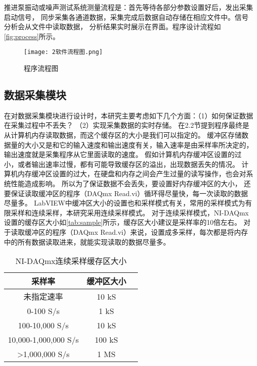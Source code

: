 推进泵振动或噪声测试系统测量流程是：首先等待各部分参数设置好后，发出采集启动信号，
同步采集各通道数据，采集完成后数据自动存储在相应文件中。信号分析会从文件中读取数据，
分析结果实时展示在界面。程序设计流程如\autoref{fig:process}所示。
\begin{figure}[htbp]
    \centering
    \texttt{[image: 2软件流程图.png]}
    \caption{\label{fig:process}程序流程图}
\end{figure}

\begin{comment}
\subsection{系统设置模块}
软件界面的设置模块提供了测试系统各项参数设定，包括采集通道设置、采样参数设置、
传感器灵敏度设置、分析参数设置等。
\begin{figure}[htbp]
    \centering
    \texttt{[image: 2系统设置.png]}
    \caption{\label{fig:setting}系统设置}
\end{figure}
\end{comment}

\subsection{数据采集模块}
在对数据采集模块进行设计时，本研究主要考虑如下几个方面：（1）如何保证数据在采集过程中不丢失？
（2）实现采集数据的实时存储。
在2.2节提到程序最终是从计算机内存读取数据，而这个缓存区的大小是我们可以指定的。
缓冲区存储数据量的大小又是和它的输入速度和输出速度有关，输入速率是由采样率所决定的，
输出速度就是采集程序从它里面读取的速度。
假如计算机内存缓冲区设置的过小，或者输出速率过慢，都有可能导致缓存区的溢出，出现数据丢失的情况。
计算机内存缓冲区设置的过大，在硬盘和内存之间会产生过量的读写操作，也会对系统性能造成影响。
所以为了保证数据不会丢失，要设置好内存缓冲区的大小，
还要保证读取缓冲区的程序（DAQmx Read.vi）循环得尽量快，每一次读取的数据尽量多。
LabVIEW中缓冲区大小的设置也和采样模式有关，常用的采样模式为有限采样和连续采样，本研究采用连续采样模式。
对于连续采样模式，NI-DAQmx设置的缓存区大小如\autoref{tab:sample}所示，缓存区大小建议是采样率的10倍左右。
对于读取缓冲区的程序（DAQmx Read.vi）来说，设置成多采样，每次都是将内存中的所有数据读取进来，就能实现读取的数据尽量多。
\begin{table}[htbp]
    \centering
    \caption{\label{tab:sample}NI-DAQmx连续采样缓存区大小}
    \begin{tabular}{ccc}
     \toprule
     采样率&缓冲区大小\\
     \midrule
     未指定速率&10 kS\\
     0-100 S/s&1 kS\\
     100-10,000 S/s&10 kS\\
     10,000-1,000,000 S/s&100 kS\\
     >1,000,000 S/s&1 MS\\
     \bottomrule
    \end{tabular}
\end{table}

